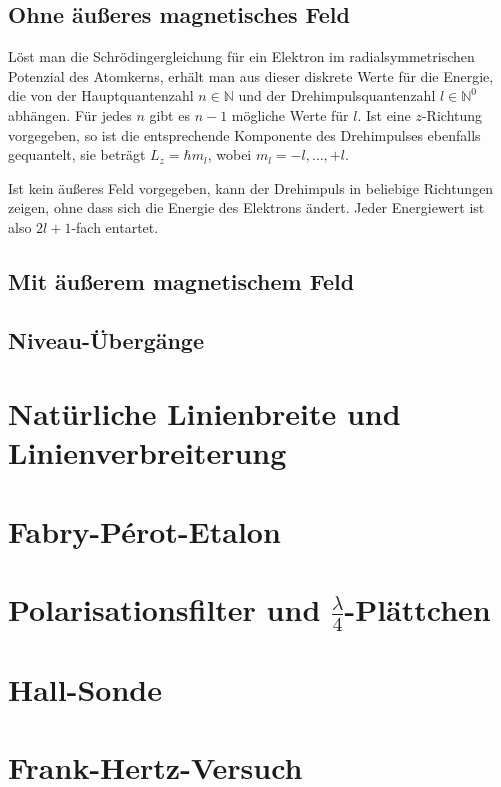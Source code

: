 \subsection{Ohne äußeres magnetisches Feld}

Löst man die Schrödingergleichung für ein Elektron im radialsymmetrischen
Potenzial des Atomkerns, erhält man aus dieser diskrete Werte für die Energie,
die von der Hauptquantenzahl $n\in\mathbb{N}$ und der Drehimpulsquantenzahl
$l\in\mathbb{N}^0$ abhängen. Für jedes $n$ gibt es $n-1$ mögliche Werte für
$l$. Ist eine $z$-Richtung vorgegeben, so ist die entsprechende Komponente des
Drehimpulses ebenfalls gequantelt, sie beträgt $L_z = \hbar m_l$, wobei $m_l
= -l,\dots,+l$.

Ist kein äußeres Feld vorgegeben, kann der Drehimpuls in beliebige Richtungen
zeigen, ohne dass sich die Energie des Elektrons ändert. Jeder Energiewert ist
also $2l+1$-fach entartet.

\subsection{Mit äußerem magnetischem Feld}

\subsection{Niveau-Übergänge}

\section{Natürliche Linienbreite und Linienverbreiterung}

\section{Fabry-Pérot-Etalon}

\section{Polarisationsfilter und $\frac{\lambda}4$-Plättchen}

\section{Hall-Sonde}

\section{Frank-Hertz-Versuch}

